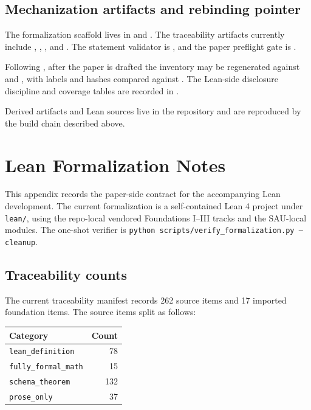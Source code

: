 \documentclass[11pt]{article}
\theoremstyle{definition}
\begin{document}
\subsection{Mechanization artifacts and rebinding pointer}
\label{appsubsec:artifact-map-mechanization}

The formalization scaffold lives in  and .
The traceability artifacts currently include
,
,
, and
.  The statement
validator is , and
the paper preflight gate is .

Following , after the paper
is drafted the inventory may be regenerated against
 and , with labels and
hashes compared against .  The
Lean-side disclosure discipline and coverage tables are recorded in
.

Derived artifacts and Lean sources live in the repository and are reproduced by
the build chain described above.
 \section{Lean Formalization Notes}\label{app:formalization}

This appendix records the paper-side contract for the accompanying Lean
development.  The current formalization is a self-contained Lean 4 project
under \texttt{lean/}, using the repo-local vendored Foundations I--III tracks
and the SAU-local modules.  The one-shot verifier is
\texttt{python scripts/verify\_formalization.py --cleanup}.

\subsection{Traceability counts}

The current traceability manifest records 262 source items and 17 imported
foundation items.  The source items split as follows:

\begin{center}
\begin{tabular}{@{}lr@{}}
\toprule
Category & Count \\
\midrule
\texttt{lean\_definition} & 78 \\
\texttt{fully\_formal\_math} & 15 \\
\texttt{schema\_theorem} & 132 \\
\texttt{prose\_only} & 37 \\
\bottomrule
\end{tabular}
\end{center}
\end{document}
